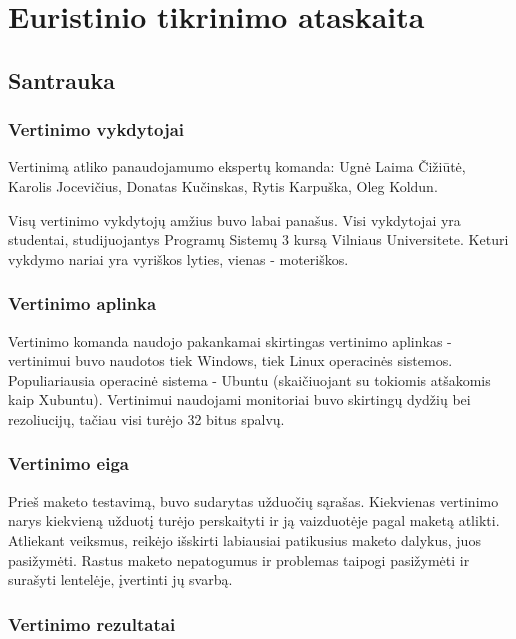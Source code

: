 \section{Euristinio tikrinimo ataskaita}

\subsection{Santrauka}

	\subsubsection{Vertinimo vykdytojai}

	Vertinimą atliko panaudojamumo ekspertų komanda:
		Ugnė Laima Čižiūtė,
		Karolis Jocevičius,
		Donatas Kučinskas,
		Rytis Karpuška,
		Oleg Koldun.
	
	Visų vertinimo vykdytojų amžius buvo labai panašus.
	Visi vykdytojai yra studentai, studijuojantys Programų Sistemų 3 kursą Vilniaus Universitete.
	Keturi vykdymo nariai yra vyriškos lyties, vienas - moteriškos.

	\subsubsection{Vertinimo aplinka}

	Vertinimo komanda naudojo pakankamai skirtingas vertinimo aplinkas - vertinimui buvo naudotos tiek Windows, tiek Linux operacinės sistemos.
	Populiariausia operacinė sistema - Ubuntu (skaičiuojant su tokiomis atšakomis kaip Xubuntu).
	Vertinimui naudojami monitoriai buvo skirtingų dydžių bei rezoliucijų, tačiau visi turėjo 32 bitus spalvų.

	\subsubsection{Vertinimo eiga}

	Prieš maketo testavimą, buvo sudarytas užduočių sąrašas.
	Kiekvienas vertinimo narys kiekvieną užduotį turėjo perskaityti ir ją vaizduotėje pagal maketą atlikti.
	Atliekant veiksmus, reikėjo išskirti labiausiai patikusius maketo dalykus, juos pasižymėti.
	Rastus maketo nepatogumus ir problemas taipogi pasižymėti ir surašyti lentelėje, įvertinti jų svarbą.

	\subsubsection{Vertinimo rezultatai}

